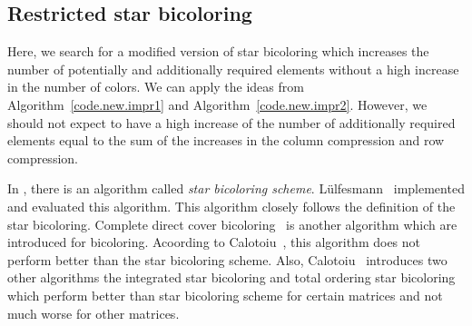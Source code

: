 \documentclass[12pt, twoside,a4paper,toc=bibliography]{scrbook}
\newcommand{\coderef}[1]{Algorithm~\protect\ref{#1}}
\begin{document}
\clearpage
\subsection{Restricted star bicoloring}
\label{s.heuristic.starbicoloring}
Here, we search for a modified version of star bicoloring
which increases the number of potentially and additionally required elements without
a high increase in the number of colors.
We can apply the ideas from \coderef{code.new.impr1} and \coderef{code.new.impr2}.
However, we should not expect to have a high increase of the number of additionally required elements
equal to the sum of the increases in the column compression and row compression.

In \cite{Gebremedhin05whatcolor}, there is an algorithm called \textit{star bicoloring scheme}.
Lülfesmann~\cite{LulfesmannMaster} implemented and evaluated this algorithm.
This algorithm closely follows the definition of the star bicoloring.
Complete direct cover bicoloring~\cite{Hossain95computinga}
is another algorithm which are introduced for bicoloring.
Acoording to Calotoiu~\cite{CalotoiuMaster}, this algorithm does not perform
better than the star bicoloring scheme.
Also, Calotoiu~\cite{CalotoiuMaster} introduces two other algorithms the integrated star bicoloring
and total ordering star bicoloring which perform better than
star bicoloring scheme for certain matrices and not much worse for other matrices.
\end{document}
